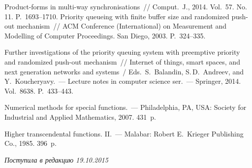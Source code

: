 \begin{multicols}{2}
{{\begin{thebibliography}{99}
 Product-forms in multi-way synchronisations~// 
{Comput.~J.}, 2014. Vol.~57. No.\,11. P.~1693--1710.
Priority queueing with finite buffer size and randomized push-out mechanism~// 
ACM  Conference (International) on Measurement and Modelling of Computer
Proceedings. San Diego, 2003. P.~324--335.

Further investigations of the priority queuing system with preemptive priority 
and randomized push-out mechanism~// 
{Internet of things, smart spaces, and next generation networks and systems}~/
Eds.\ S.~Balandin, S.\,D.~Andreev, and  Y.~Koucheryavy.~--- 
Lecture notes in computer science ser.~--- 
Springer, 2014. Vol.~8638. P.~433--443.

Numerical methods for special functions.~--- 
Philadelphia, PA, USA: Society for Industrial and Applied Mathematics, 2007. 431~p.

 Higher transcendental functions. II.~--- Malabar: Robert
E.~Krieger Publishing Co., 1985. 396~p.
\end{thebibliography}
} }

\end{multicols}

 \label{end\stat}

 \vspace*{-3pt}

\hfill{\small\textit{Поступила в редакцию  19.10.2015}}
\renewcommand{\figurename}{\protect\bf Рис.}
\renewcommand{\tablename}{\protect\bf Таблица}